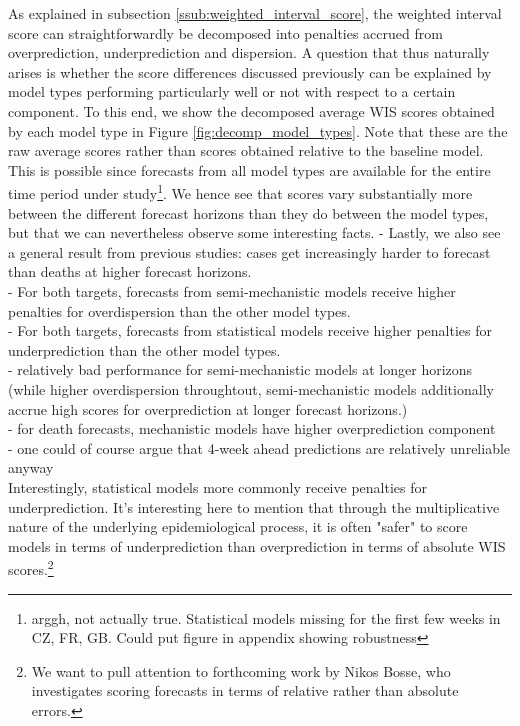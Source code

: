 As explained in subsection \ref{ssub:weighted_interval_score}, the weighted interval score can straightforwardly be decomposed into penalties accrued from overprediction, underprediction and dispersion. A question that thus naturally arises is whether the score differences discussed previously can be explained by model types performing particularly well or not with respect to a certain component. To this end, we show the decomposed average WIS scores obtained by each model type in Figure \ref{fig:decomp_model_types}. Note that these are the raw average scores rather than scores obtained relative to the baseline model. This is possible since forecasts from all model types are available for the entire time period under study\footnote{arggh, not actually true. Statistical models missing for the first few weeks in CZ, FR, GB. Could put figure in appendix showing robustness}. We hence see that scores vary substantially more between the different forecast horizons than they do between the model types, but that we can nevertheless observe some interesting facts. 
- Lastly, we also see a general result from previous studies: cases get increasingly harder to forecast than deaths at higher forecast horizons.\\
- For both targets, forecasts from semi-mechanistic models receive higher penalties for overdispersion than the other model types.\\
- For both targets, forecasts from statistical models receive higher penalties for underprediction than the other model types.\\
- relatively bad performance for semi-mechanistic models at longer horizons (while higher overdispersion throughtout, semi-mechanistic models additionally accrue high scores for overprediction at longer forecast horizons.)\\
- for death forecasts, mechanistic models have higher overprediction component\\
- one could of course argue that 4-week ahead predictions are relatively unreliable anyway \\
Interestingly, statistical models more commonly receive penalties for underprediction. It's interesting here to mention that through the multiplicative nature of the underlying epidemiological process, it is often "safer" to score models in terms of underprediction than overprediction in terms of absolute WIS scores.\footnote{We want to pull attention to forthcoming work by Nikos Bosse, who investigates scoring forecasts in terms of relative rather than absolute errors.}  \\
